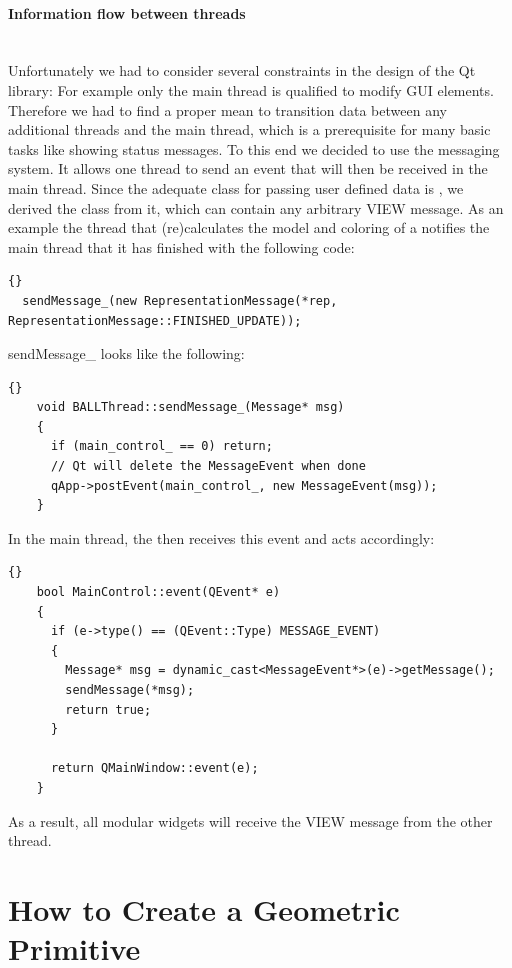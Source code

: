 \paragraph{Information flow between threads}
\hspace*{\fill}\\
Unfortunately we had to consider several constraints in the design of the Qt library: For example only the main thread 
is qualified to modify GUI elements. Therefore we had to find a proper mean to transition data between any additional 
threads and the main thread, which is a prerequisite for many basic tasks like showing status messages.
To this end we decided to use the  messaging system. It allows one thread to send an event that will
then be received in the main thread. Since the adequate class for passing user defined data
is , we derived the class  from it, which can contain any arbitrary VIEW message.
As an example the thread that (re)calculates the model and coloring of a  notifies the main thread
that it has finished with the following code:
\begin{lstlisting}{}
  sendMessage_(new RepresentationMessage(*rep, RepresentationMessage::FINISHED_UPDATE));
\end{lstlisting}
sendMessage\_ looks like the following:
\begin{lstlisting}{}
    void BALLThread::sendMessage_(Message* msg)
    {
      if (main_control_ == 0) return;
      // Qt will delete the MessageEvent when done
      qApp->postEvent(main_control_, new MessageEvent(msg));
    }
\end{lstlisting}

In the main thread, the  then receives this event and acts
accordingly:
\begin{lstlisting}{}
    bool MainControl::event(QEvent* e)
    {
      if (e->type() == (QEvent::Type) MESSAGE_EVENT)
      {
        Message* msg = dynamic_cast<MessageEvent*>(e)->getMessage();
        sendMessage(*msg);
        return true;
      }

      return QMainWindow::event(e);
    }
\end{lstlisting}

As a result, all modular widgets will receive the VIEW message from the other
thread.


\section{How to Create a Geometric Primitive}
\label{section:view_create_a_geometric_primitive}

